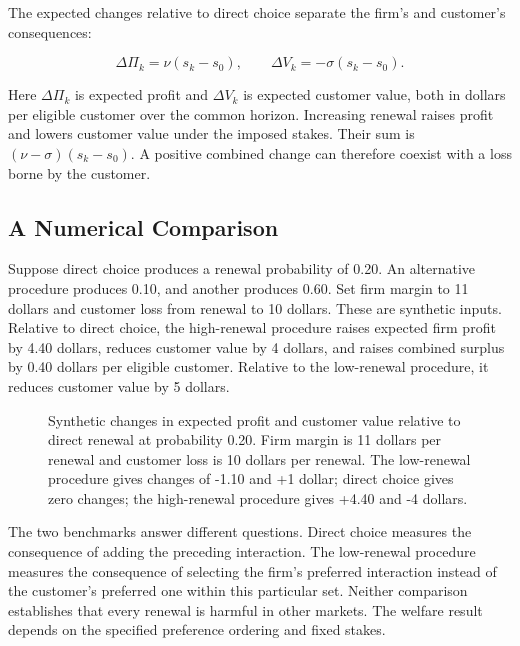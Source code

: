 The expected changes relative to direct choice separate the firm's and
customer's consequences:

\[
\Delta\Pi_k=\nu(s_k-s_0),\qquad
\Delta V_k=-\sigma(s_k-s_0).
\]

Here \(\Delta\Pi_k\) is expected profit and \(\Delta V_k\) is expected
customer value, both in dollars per eligible customer over the common
horizon. Increasing renewal raises profit and lowers customer value
under the imposed stakes. Their sum is \((\nu-\sigma)(s_k-s_0)\). A
positive combined change can therefore coexist with a loss borne by the
customer.

\hypertarget{M08-a-numerical-comparison}{%
\subsection{A Numerical Comparison}\label{M08-a-numerical-comparison}}

\noindent \noindent Suppose direct choice produces a renewal probability of 0.20.
An alternative procedure produces 0.10, and another produces 0.60. Set
firm margin to 11 dollars and customer loss from renewal to 10 dollars.
These are synthetic inputs. Relative to direct choice, the high-renewal
procedure raises expected firm profit by 4.40 dollars, reduces customer
value by 4 dollars, and raises combined surplus by 0.40 dollars per
eligible customer. Relative to the low-renewal procedure, it reduces
customer value by 5 dollars.

\begin{figure}[htbp]
\centering

\caption{Synthetic changes in expected profit and customer value relative to direct renewal at probability 0.20. Firm margin is 11 dollars per renewal and customer loss is 10 dollars per renewal. The low-renewal procedure gives changes of -1.10 and +1 dollar; direct choice gives zero changes; the high-renewal procedure gives +4.40 and -4 dollars.}\label{fig:M08_retention_welfare}
\end{figure}

The two benchmarks answer different questions. Direct choice measures
the consequence of adding the preceding interaction. The low-renewal
procedure measures the consequence of selecting the firm's preferred
interaction instead of the customer's preferred one within this
particular set. Neither comparison establishes that every renewal is
harmful in other markets. The welfare result depends on the specified
preference ordering and fixed stakes.

